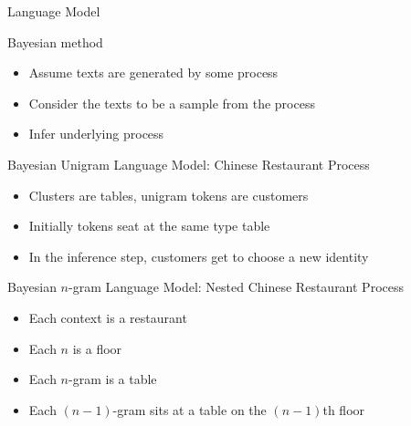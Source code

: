 \begin{frame}{Language Model}
    \begin{block}{Bayesian method}
        \begin{itemize}
            \item Assume texts are generated by some process
            \item Consider the texts to be a sample from the process
            \item Infer underlying process
        \end{itemize}
    \end{block}

    \begin{block}{Bayesian Unigram Language Model: Chinese Restaurant Process}
        \begin{itemize}
            \item Clusters are tables, unigram tokens are customers
            \item Initially tokens seat at the same type table
            \item In the inference step, customers get to choose a new identity
        \end{itemize}
    \end{block}

    \begin{block}{Bayesian $n$-gram Language Model: Nested Chinese Restaurant Process}
        \begin{itemize}
            \item Each context is a restaurant
            \item Each $n$ is a floor
            \item Each $n$-gram is a table
            \item Each $(n-1)$-gram sits at a table on the $(n-1)$th floor
        \end{itemize}
    \end{block}
\end{frame}

